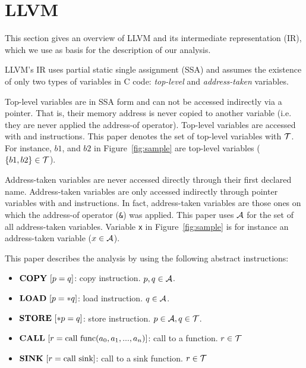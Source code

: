 \section{LLVM}\label{sec:llvm}

This section gives an overview of LLVM and its
intermediate representation (IR), which we use
as basis for the description of our analysis.

LLVM's IR uses partial static single assignment (SSA)
and assumes the existence of only two types of variables
in C code: \textit{top-level} and \textit{address-taken}
variables.

Top-level variables are in SSA form and can not be
accessed indirectly via a pointer. That is, their memory
address is never copied to another variable (i.e. they are
never applied the address-of operator). Top-level variables
are accessed with \alloct and \copyt instructions.
This paper denotes the set of top-level variables
with $\mathcal{T}$. For instance, $b1$, and $b2$ in Figure~\ref{fig:sample}
are top-level variables ($\{b1, b2\} \in \mathcal{T}$).

Address-taken variables are never accessed directly through
their first declared name. Address-taken variables are only
accessed indirectly through pointer variables with \loadt and
\storet instructions. In fact, address-taken variables
are those ones on which the address-of operator (\texttt{\&})
was applied. This paper uses $\mathcal{A}$ for the set of all address-taken
variables. Variable \texttt{x} in Figure~\ref{fig:sample} is
for instance an address-taken variable ($x \in \mathcal{A}$).

This paper describes the analysis by using the following abstract
instructions:
\begin{itemize}
\item $\text{\textbf{COPY}}\ [p = q]$: copy instruction. $p, q \in \mathcal{A}$.
\item $\text{\textbf{LOAD}}\ [p = *q]$: load instruction. $q \in \mathcal{A}$.
\item $\text{\textbf{STORE}}\ [*p = q]$: store instruction. $p \in \mathcal{A}, q \in \mathcal{T}$.
\item $\text{\textbf{CALL}}\ [r = \text{call}\ \text{func}(a_0, a_1, ..., a_n)]$: call to a function. $r \in \mathcal{T}$
\item $\text{\textbf{SINK}}\ [r = \text{call}\ \text{sink}]$: call to a sink function. $r \in \mathcal{T}$
\end{itemize}
